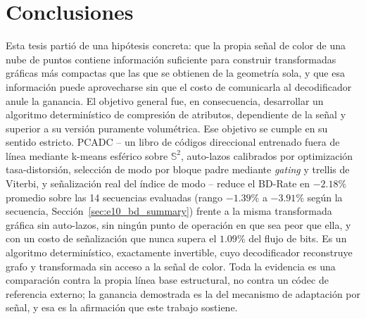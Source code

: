 \chapter{Conclusiones}
\label{sec:conclusiones}

Esta tesis partió de una hipótesis concreta: que la propia señal de color de una nube de puntos
contiene información suficiente para construir transformadas gráficas más compactas que las que
se obtienen de la geometría sola, y que esa información puede aprovecharse sin que el costo de
comunicarla al decodificador anule la ganancia. El objetivo general fue, en consecuencia,
desarrollar un algoritmo determinístico de compresión de atributos, dependiente de la señal y
superior a su versión puramente volumétrica. Ese objetivo se cumple en su sentido estricto.
PCADC -- un libro de códigos direccional entrenado fuera de línea mediante k-means esférico
sobre $\mathbb{S}^2$, auto-lazos calibrados por optimización tasa-distorsión, selección de modo
por bloque padre mediante \textit{gating} y trellis de Viterbi, y señalización real del índice
de modo -- reduce el BD-Rate en $-2.18\%$ promedio sobre las 14 secuencias evaluadas (rango
$-1.39\%$ a $-3.91\%$ según la secuencia, Sección~\ref{sec:e10_bd_summary}) frente a la misma
transformada gráfica sin auto-lazos, sin ningún punto de operación en que sea peor que ella, y
con un costo de señalización que nunca supera el $1.09\%$ del flujo de bits. Es un algoritmo
determinístico, exactamente invertible, cuyo decodificador reconstruye grafo y transformada sin
acceso a la señal de color. Toda la evidencia es una comparación contra la propia línea base
estructural, no contra un códec de referencia externo; la ganancia demostrada es la del
mecanismo de adaptación por señal, y esa es la afirmación que este trabajo sostiene.


